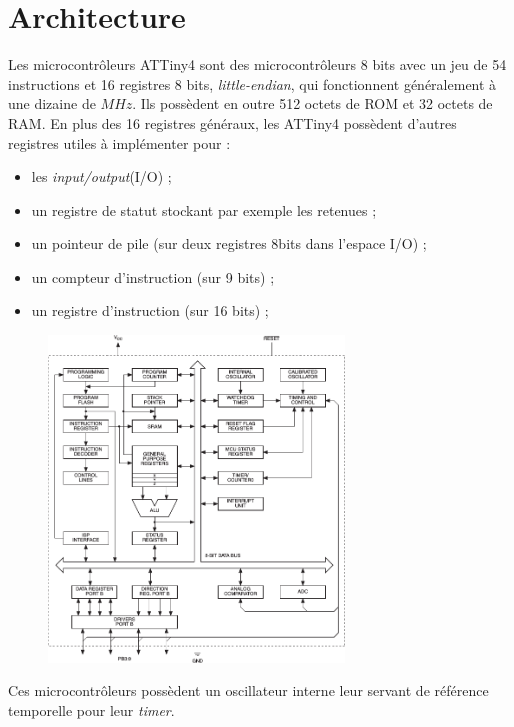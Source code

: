 \documentclass[11pt]{article}
\begin{document}
\section{Architecture}
Les microcontrôleurs ATTiny4 sont des microcontrôleurs 8 bits avec un
jeu de 54 instructions et 16 registres 8 bits, \emph{little-endian}, qui
fonctionnent généralement à une dizaine de $MHz$. Ils possèdent en
outre 512 octets de ROM et 32 octets de RAM. En plus des 16 registres
généraux, les ATTiny4 possèdent d'autres registres utiles à implémenter pour :
\begin{itemize}
  \item les \emph{input/output}(I/O) ;
  \item un registre de statut stockant par exemple les
    retenues ;
  \item un pointeur de pile (sur deux registres 8bits dans l'espace
    I/O) ;
  \item un compteur d'instruction (sur 9 bits) ;
  \item un registre d'instruction (sur 16 bits) ;
\end{itemize}
\begin{figure}[h!]
  \begin{center}
    \includegraphics[width=0.7\textwidth]{images/block_diagram.png}
  \end{center}
\end{figure}

Ces microcontrôleurs possèdent un oscillateur interne leur servant de
référence temporelle pour leur \emph{timer}.
\end{document}
